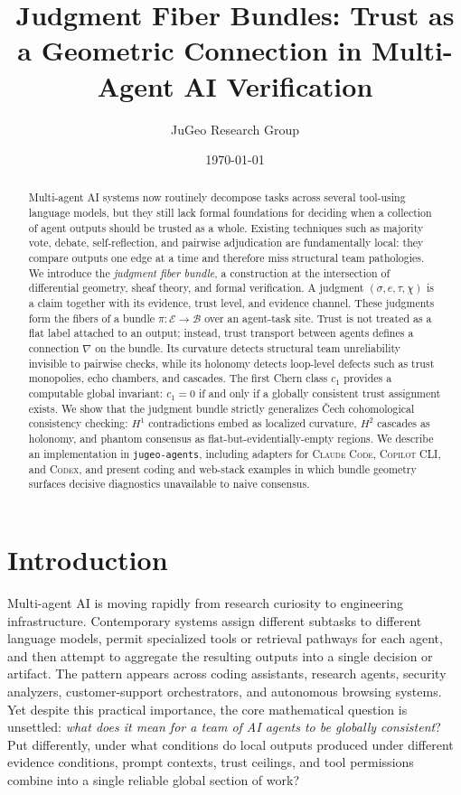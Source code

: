 \documentclass[11pt]{article}
\title{\textbf{Judgment Fiber Bundles: Trust as a Geometric Connection in Multi-Agent AI Verification}}
\author{JuGeo Research Group}
\date{\today}
\newcommand{\Bundle}{\mathcal{E}}
\newcommand{\Base}{\mathcal{B}}
\newcommand{\Conn}{\nabla}
\newcommand{\Chern}{c_1}
\newcommand{\Claim}{\sigma}
\newcommand{\Evidence}{e}
\newcommand{\Channel}{\chi}
\newcommand{\TrustVar}{\tau}
\newcommand{\JuGeoAgents}{\texttt{jugeo-agents}}
\newcommand{\ClaudeCode}{\textsc{Claude Code}}
\newcommand{\CopilotCLI}{\textsc{Copilot CLI}}
\newcommand{\CodexCLI}{\textsc{Codex}}
\begin{document}
\maketitle

\begin{abstract}
Multi-agent AI systems now routinely decompose tasks across several tool-using
language models, but they still lack formal foundations for deciding when a
collection of agent outputs should be trusted as a whole.  Existing techniques
such as majority vote, debate, self-reflection, and pairwise adjudication are
fundamentally local: they compare outputs one edge at a time and therefore miss
structural team pathologies.  We introduce the \emph{judgment fiber bundle}, a
construction at the intersection of differential geometry, sheaf theory, and
formal verification.  A judgment $(\Claim, \Evidence, \TrustVar, \Channel)$ is a
claim together with its evidence, trust level, and evidence channel.  These
judgments form the fibers of a bundle $\pi : \Bundle \to \Base$ over an
agent-task site.  Trust is not treated as a flat label attached to an output;
instead, trust transport between agents defines a connection $\Conn$ on the
bundle.  Its curvature detects structural team unreliability invisible to
pairwise checks, while its holonomy detects loop-level defects such as trust
monopolies, echo chambers, and cascades.  The first Chern class $\Chern$
provides a computable global invariant: $\Chern = 0$ if and only if a globally
consistent trust assignment exists.  We show that the judgment bundle strictly
generalizes \v{C}ech cohomological consistency checking: $H^1$ contradictions
embed as localized curvature, $H^2$ cascades as holonomy, and phantom consensus
as flat-but-evidentially-empty regions.  We describe an implementation in
\JuGeoAgents{}, including adapters for \ClaudeCode{}, \CopilotCLI{}, and
\CodexCLI{}, and present coding and web-stack examples in which bundle geometry
surfaces decisive diagnostics unavailable to naive consensus.
\end{abstract}

\newpage

\section{Introduction}\label{sec:introduction}

Multi-agent AI is moving rapidly from research curiosity to engineering
infrastructure.  Contemporary systems assign different subtasks to different
language models, permit specialized tools or retrieval pathways for each agent,
and then attempt to aggregate the resulting outputs into a single decision or
artifact.  The pattern appears across coding assistants, research agents,
security analyzers, customer-support orchestrators, and autonomous browsing
systems.  Yet despite this practical importance, the core mathematical question
is unsettled: \emph{what does it mean for a team of AI agents to be globally
consistent}?  Put differently, under what conditions do local outputs produced
under different evidence conditions, prompt contexts, trust ceilings, and tool
permissions combine into a single reliable global section of work?
\end{document}
